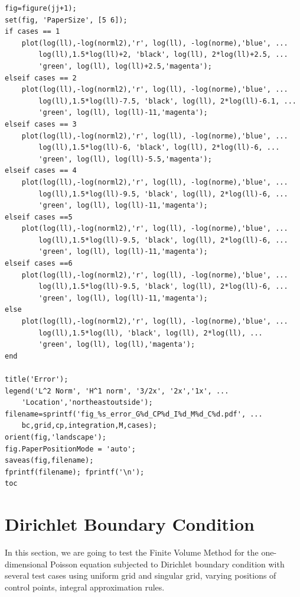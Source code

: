 \documentclass[a4paper]{article}
\numberwithin{equation}{section}
\begin{document}
\begin{verbatim}
fig=figure(jj+1);
set(fig, 'PaperSize', [5 6]);
if cases == 1
    plot(log(ll),-log(norml2),'r', log(ll), -log(norme),'blue', ...
        log(ll),1.5*log(ll)+2, 'black', log(ll), 2*log(ll)+2.5, ...
        'green', log(ll), log(ll)+2.5,'magenta');
elseif cases == 2
    plot(log(ll),-log(norml2),'r', log(ll), -log(norme),'blue', ...
        log(ll),1.5*log(ll)-7.5, 'black', log(ll), 2*log(ll)-6.1, ...
        'green', log(ll), log(ll)-11,'magenta');
elseif cases == 3
    plot(log(ll),-log(norml2),'r', log(ll), -log(norme),'blue', ...
        log(ll),1.5*log(ll)-6, 'black', log(ll), 2*log(ll)-6, ...
        'green', log(ll), log(ll)-5.5,'magenta');
elseif cases == 4
    plot(log(ll),-log(norml2),'r', log(ll), -log(norme),'blue', ...
        log(ll),1.5*log(ll)-9.5, 'black', log(ll), 2*log(ll)-6, ...
        'green', log(ll), log(ll)-11,'magenta');
elseif cases ==5
    plot(log(ll),-log(norml2),'r', log(ll), -log(norme),'blue', ...
        log(ll),1.5*log(ll)-9.5, 'black', log(ll), 2*log(ll)-6, ...
        'green', log(ll), log(ll)-11,'magenta');
elseif cases ==6
    plot(log(ll),-log(norml2),'r', log(ll), -log(norme),'blue', ...
        log(ll),1.5*log(ll)-9.5, 'black', log(ll), 2*log(ll)-6, ...
        'green', log(ll), log(ll)-11,'magenta');
else
    plot(log(ll),-log(norml2),'r', log(ll), -log(norme),'blue', ...
        log(ll),1.5*log(ll), 'black', log(ll), 2*log(ll), ...
        'green', log(ll), log(ll),'magenta');
end

title('Error');
legend('L^2 Norm', 'H^1 norm', '3/2x', '2x','1x', ...
    'Location','northeastoutside');
filename=sprintf('fig_%s_error_G%d_CP%d_I%d_M%d_C%d.pdf', ...
    bc,grid,cp,integration,M,cases);
orient(fig,'landscape');
fig.PaperPositionMode = 'auto';
saveas(fig,filename);
fprintf(filename); fprintf('\n');
toc
\end{verbatim}
\section{Dirichlet Boundary Condition}
In this section, we are going to test the Finite Volume Method for the one-dimensional Poisson equation subjected to Dirichlet boundary condition with several test cases using uniform grid and singular grid, varying positions of control points, integral approximation rules.
\end{document}
